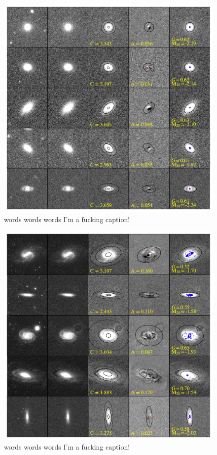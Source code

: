 \begin{figure}
\includegraphics[width=\textwidth]{Figures/measure_morph_bin1.pdf}
\caption[Examples of image cleaning and morphology diagnostic measurements]{words words words I'm a fucking caption!}
\label{fig: clean examples}
\end{figure}

\begin{figure}
\includegraphics[width=\textwidth]{Figures/measure_morph_hardest.pdf}
\caption[Examples of image cleaning and morphology diagnostic measurements]{words words words I'm a fucking caption!}
\label{fig: clean examples}
\end{figure}



